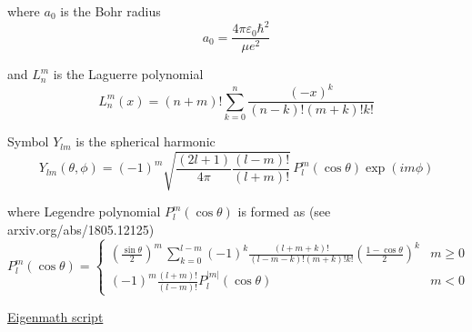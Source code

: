 where $a_0$ is the Bohr radius
\begin{equation*}
a_0=\frac{4\pi\varepsilon_0\hbar^2}{\mu e^2}
\end{equation*}

and $L_n^m$ is the Laguerre polynomial
\begin{equation*}
L_n^m(x)=(n+m)!\sum_{k=0}^n
\frac{(-x)^k}{(n-k)!(m+k)!k!}
\end{equation*}

Symbol $Y_{lm}$ is the spherical harmonic
\begin{equation*}
Y_{lm}(\theta,\phi)=(-1)^m
\sqrt{\frac{(2l+1)}{4\pi}
\frac{(l-m)!}{(l+m)!}}\,
P_l^m(\cos\theta)\exp(im\phi)
\end{equation*}

where Legendre polynomial $P_l^m(\cos\theta)$ is formed as (see arxiv.org/abs/1805.12125)
\begin{equation*}
P_l^m(\cos\theta)=\begin{cases}
\displaystyle
\left(\frac{\sin\theta}{2}\right)^m\,\sum_{k=0}^{l-m}
(-1)^k\frac{(l+m+k)!}{(l-m-k)!(m+k)!k!}
\left(\frac{1-\cos\theta}{2}\right)^k & m\ge0
\\[4ex]
\displaystyle
(-1)^m\frac{(l+m)!}{(l-m)!}P_l^{|m|}(\cos\theta) & m<0
\end{cases}
\end{equation*}

\href{https://georgeweigt.github.io/examples/hydrogen-atom-1-demo.html}{Eigenmath script}


